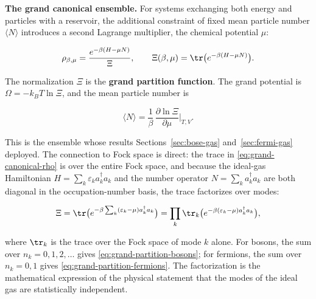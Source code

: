 \medskip\noindent\textbf{The grand canonical ensemble.}
For systems exchanging both energy and particles with a reservoir, the additional constraint of fixed mean particle number $\langle N \rangle$ introduces a second Lagrange multiplier, the chemical potential $\mu$:
\begin{linenomath}
    \begin{equation}
        \rho_{\beta,\mu} = \frac{e^{-\beta(H - \mu N)}}{\Xi},
        \qquad
        \Xi(\beta, \mu) = \tr\bigl(e^{-\beta(H - \mu N)}\bigr).
        \label{eq:grand-canonical-rho}
    \end{equation}
\end{linenomath}
The normalization $\Xi$ is the \textbf{grand partition function}. The grand potential is $\Omega = -k_B T\ln\Xi$, and the mean particle number is
\begin{linenomath}
    \begin{equation*}
        \langle N \rangle = \frac{1}{\beta}\,\frac{\partial\ln\Xi}{\partial\mu}\bigg|_{T,V}.
    \end{equation*}
\end{linenomath}
This is the ensemble whose results Sections~\ref{sec:bose-gas} and~\ref{sec:fermi-gas} deployed. The connection to Fock space is direct: the trace in \eqref{eq:grand-canonical-rho} is over the entire Fock space, and because the ideal-gas Hamiltonian $H = \sum_k \varepsilon_k a_k^\dagger a_k$ and the number operator $N = \sum_k a_k^\dagger a_k$ are both diagonal in the occupation-number basis, the trace factorizes over modes:
\begin{linenomath}
    \begin{equation*}
        \Xi = \tr\bigl(e^{-\beta\sum_k(\varepsilon_k - \mu)a_k^\dagger a_k}\bigr)
            = \prod_k \tr_k\bigl(e^{-\beta(\varepsilon_k - \mu)a_k^\dagger a_k}\bigr),
    \end{equation*}
\end{linenomath}
where $\tr_k$ is the trace over the Fock space of mode $k$ alone. For bosons, the sum over $n_k = 0, 1, 2, \ldots$ gives \eqref{eq:grand-partition-bosons}; for fermions, the sum over $n_k = 0, 1$ gives \eqref{eq:grand-partition-fermions}. The factorization is the mathematical expression of the physical statement that the modes of the ideal gas are statistically independent.

